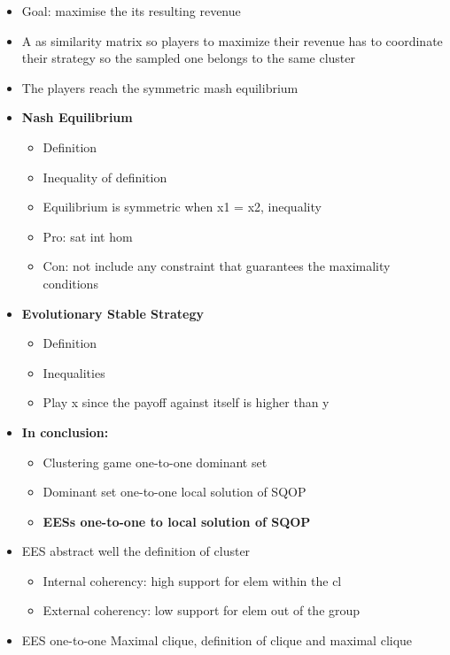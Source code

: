 \begin{itemize}
\begin{itemize}
        \item Goal: maximise the its resulting revenue
        \item A as similarity matrix so players to maximize their revenue has to coordinate their strategy so the sampled one belongs to the same cluster
        \item The players reach the symmetric mash equilibrium
        \item \textbf{Nash Equilibrium}
        \begin{itemize}
            \item Definition
            \item Inequality of definition
            \item Equilibrium is symmetric when x1 = x2, inequality
            \item Pro: sat int hom
            \item Con: not include any constraint that guarantees the maximality conditions
        \end{itemize}
        \item \textbf{Evolutionary Stable Strategy}
        \begin{itemize}
            \item Definition
            \item Inequalities
            \item Play x since the payoff against itself is higher than y
        \end{itemize}
        \item \textbf{In conclusion:}
        \begin{itemize}
            \item Clustering game one-to-one dominant set
            \item Dominant set one-to-one local solution of SQOP
            \item \textbf{EESs one-to-one to local solution of SQOP}
        \end{itemize}
        \item EES abstract well the definition of cluster
        \begin{itemize}
            \item Internal coherency: high support for elem within the cl
            \item External coherency: low support for elem out of the group
        \end{itemize}
        \item EES one-to-one Maximal clique, definition of clique and maximal clique

\end{itemize}
\end{itemize}
